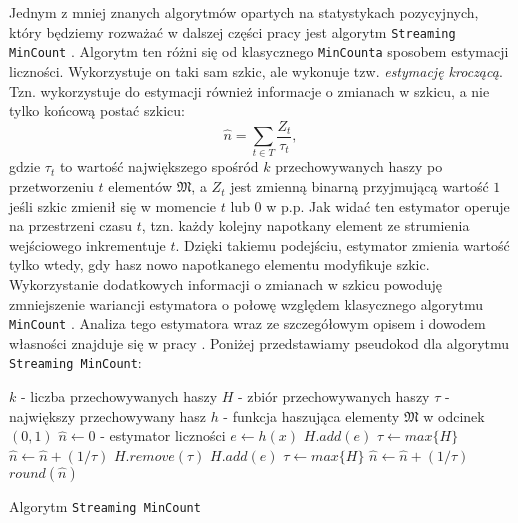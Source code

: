Jednym z mniej znanych algorytmów opartych na statystykach pozycyjnych, który będziemy rozważać w dalszej części pracy jest algorytm \texttt{Streaming MinCount} \cite{streamed}. Algorytm ten różni się od klasycznego \texttt{MinCounta} sposobem estymacji liczności. Wykorzystuje on taki sam szkic, ale wykonuje tzw. \textit{estymację kroczącą}. Tzn. wykorzystuje do estymacji również informacje o zmianach w szkicu, a nie tylko końcową postać szkicu:
\begin{equation}
    \hat{n} = \sum_{t \in T} \frac{Z_t}{\tau_{t}},
    \label{streaming_est}
\end{equation}
gdzie $\tau_{t}$ to wartość największego spośród $k$ przechowywanych haszy po przetworzeniu $t$ elementów $\mathfrak{M}$, a $Z_t$ jest zmienną binarną przyjmującą wartość $1$ jeśli szkic zmienił się w momencie $t$ lub $0$ w p.p. Jak widać ten estymator operuje na przestrzeni czasu $t$, tzn. każdy kolejny napotkany element ze strumienia wejściowego inkrementuje $t$. Dzięki takiemu podejściu, estymator zmienia wartość tylko wtedy, gdy hasz nowo napotkanego elementu modyfikuje szkic. Wykorzystanie dodatkowych informacji o zmianach w szkicu powoduję zmniejszenie wariancji estymatora o połowę względem klasycznego algorytmu \texttt{MinCount} \cite{ting}. Analiza tego estymatora wraz ze szczegółowym opisem i dowodem własności znajduje się w pracy \cite{streamed}. Poniżej przedstawiamy 
pseudokod dla algorytmu \texttt{Streaming MinCount}:
\newline
\begin{algorithm}
    \begin{algorithmic}
    \State $k $ - liczba przechowywanych haszy 
    \State $H  $ - zbiór przechowywanych haszy
    \State $\tau  $ - największy przechowywany hasz 
    \State $h  $ - funkcja haszująca elementy $\mathfrak{M}$ w odcinek $(0, 1)$
    \State $\hat{n} \gets 0$  - estymator liczności
    \newline
        \State $e \gets h(x)$
                \State $H.add(e)$
                \State $\tau \gets max\{H\}$
                \State $\hat{n} \gets \hat{n} + (1/\tau)$
                \State $H.remove(\tau)$
                \State $H.add(e)$
                \State $\tau \gets max\{H\}$
                \State $\hat{n} \gets \hat{n} + (1/\tau)$
            \EndIf
        \EndIf
    \EndFunction
    \newline
        \State \Return $round(\hat{n})$
    \EndFunction
    
    \end{algorithmic}
    \caption{Algorytm \texttt{Streaming MinCount}}
\end{algorithm}

